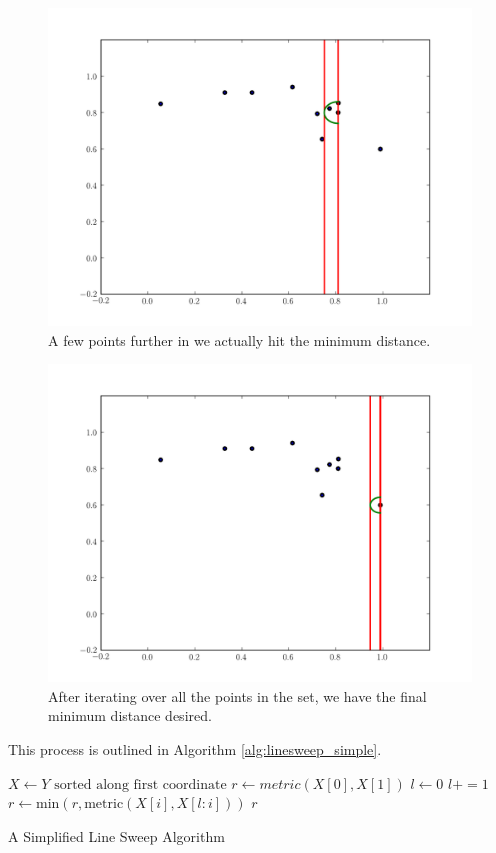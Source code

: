 \begin{figure}[H]
\includegraphics[width = .8\textwidth]{simple5.pdf}
\caption{A few points further in we actually hit the minimum distance.}
\end{figure}

\begin{figure}[H]
\includegraphics[width = .8\textwidth]{simple7.pdf}
\caption{After iterating over all the points in the set, we have the final minimum distance desired.}
\end{figure}

This process is outlined in Algorithm \ref{alg:linesweep_simple}.
\begin{algorithm}
\begin{algorithmic}[1]
	\State $X \gets Y \text{ sorted along first coordinate}$		
	\State $r \gets metric\left(X\left[0\right], X\left[1\right]\right)$	
	\State $l \gets 0$								
									
				
			\State $l += 1$
		\EndWhile
										
			\State $r \gets \text{min}\left(r, \text{metric}\left(X\left[i\right], X\left[l:i\right]\right)\right)$
		\EndIf
	\EndFor
	\State {} $r$
\EndProcedure
\end{algorithmic}
\caption{A Simplified Line Sweep Algorithm}
\label{alg:linesweep_simple}
\end{algorithm}

